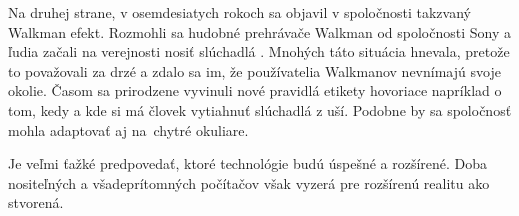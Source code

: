 Na druhej strane, v osemdesiatych rokoch sa objavil v spoločnosti takzvaný Walkman efekt. Rozmohli sa hudobné prehrávače Walkman od spoločnosti Sony a ľudia začali na verejnosti nosiť slúchadlá \cite{Honan13}. Mnohých táto situácia hnevala, pretože to považovali za drzé a zdalo sa im, že používatelia Walkmanov nevnímajú svoje okolie. Časom sa prirodzene vyvinuli nové pravidlá etikety hovoriace napríklad o tom, kedy a kde si má človek vytiahnuť slúchadlá z uší. Podobne by sa spoločnosť mohla adaptovať aj na~chytré okuliare.

Je veľmi ťažké predpovedať, ktoré technológie budú úspešné a rozšírené. Doba nositeľných a všadeprítomných počítačov však vyzerá pre rozšírenú realitu ako stvorená.

\pagebreak